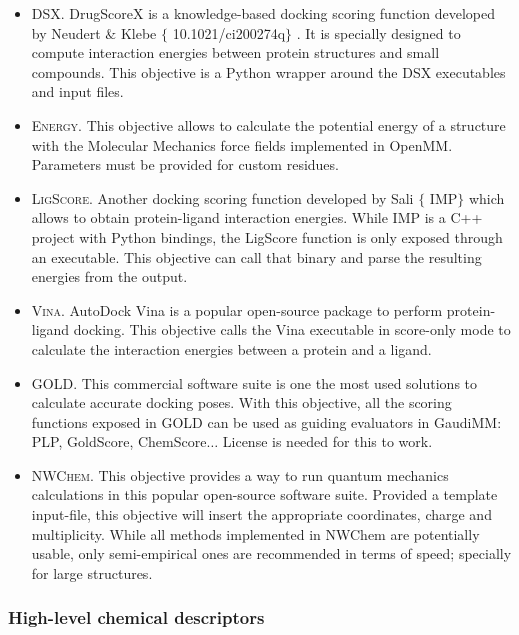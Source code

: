 \begin{itemize}
	\item \textsc{DSX}. DrugScoreX is a knowledge-based docking scoring function developed by Neudert $\&$  Klebe $ \{ $ 10.1021/ci200274q$ \} $ . It is specially designed to compute interaction energies between protein structures and small compounds. This objective is a Python wrapper around the DSX executables and input files.

	\item \textsc{Energy}. This objective allows to calculate the potential energy of a structure with the Molecular Mechanics force fields implemented in OpenMM. Parameters must be provided for custom residues.

	\item \textsc{LigScore}. Another docking scoring function developed by Sali $ \{ $ IMP$ \} $  which allows to obtain protein-ligand interaction energies. While IMP is a C++ project with Python bindings, the LigScore function is only exposed through an executable. This objective can call that binary and parse the resulting energies from the output.

	\item \textsc{Vina}. AutoDock Vina is a popular open-source package to perform protein-ligand docking. This objective calls the Vina executable in score-only mode to calculate the interaction energies between a protein and a ligand.

	\item \textsc{GOLD}. This commercial software suite is one the most used solutions to calculate accurate docking poses. With this objective, all the scoring functions exposed in GOLD can be used as guiding evaluators in GaudiMM: PLP, GoldScore, ChemScore$ \ldots $  License is needed for this to work.

	\item \textsc{NWChem}. This objective provides a way to run quantum mechanics calculations in this popular open-source software suite. Provided a template input-file, this objective will insert the appropriate coordinates, charge and multiplicity. While all methods implemented in NWChem are potentially usable, only semi-empirical ones are recommended in terms of speed; specially for large structures.


\end{itemize}\subsubsection{High-level chemical descriptors}
